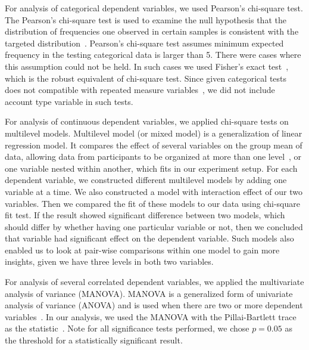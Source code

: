 \documentclass[conference]{IEEEtran}
\begin{document}
For analysis of categorical dependent variables, we used Pearson's chi-square test. The Pearson's chi-square test is used to examine the null hypothesis that the distribution of frequencies one observed in certain samples is consistent with the targeted distribution~\cite{doi:10.1080/14786440009463897}. 
Pearson's chi-square test assumes minimum expected frequency in the testing categorical data is larger than 5.
There were cases where this assumption could not be held. In such cases we used Fisher's exact test~\cite{doi:10.2307/2340521}, which is the robust equivalent of chi-square test. Since given categorical tests does not compatible with repeated measure variables~\cite{isbn:9781446200469}, we did not include account type variable in such tests.

For analysis of continuous dependent variables, we applied chi-square tests on multilevel models. Multilevel model (or mixed model) is a generalization of linear regression model. It compares the effect of several variables on the group mean of data, allowing data from participants to be organized at more than one level~\cite{barbarataba2007}, or one variable nested within another, which fits in our experiment setup. For each dependent variable, we constructed different multilevel models by adding one variable at a time. We also constructed a model with interaction effect of our two variables. Then we compared the fit of these models to our data using chi-square fit test. If the result showed significant difference between two models, which should differ by whether having one particular variable or not, then we concluded that variable had significant effect on the dependent variable. Such models also enabled us to look at pair-wise comparisons within one model to gain more insights, given we have three levels in both two variables.

For analysis of several correlated dependent variables, we applied the multivariate analysis of variance (MANOVA). MANOVA is a generalized form of univariate analysis of variance (ANOVA) and is used when there are two or more dependent variables~\cite{Stevens:1986:AMS:21800}. In our analysis, we used the MANOVA with the Pillai-Bartlett trace as the statistic~\cite{isbn:9781446200469}.
Note for all significance tests performed, we chose $p=0.05$ as the threshold for a statistically significant result.





 
\let\oldtabular\tabular
\renewcommand{\tabular}{\small\oldtabular}
\end{document}
